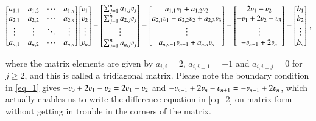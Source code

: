 \documentclass[11pt,english,a4paper]{article}
\begin{document}
\begin{flushleft}
\begin{align*}
\begin{bmatrix} a_{1,1} & a_{1,2} & \cdots & a_{1,n} \\ a_{2,1} & a_{2,2} & \cdots & a_{2,n}  \\ \vdots & \vdots & \ddots & \vdots \\ a_{n,1} & a_{n,2} & \cdots & a_{n,n} \end{bmatrix} \begin{bmatrix} \varv_1 \\ \varv_2 \\ \vdots \\  \varv_n \end{bmatrix} 
= \begin{bmatrix} \sum_{j=1}^n a_{1,j} \varv_j \\ \sum_{j=1}^n a_{2,j} \varv_j \\ \vdots \\ \sum_{j=1}^n a_{n,j} \varv_j \end{bmatrix} 
= \begin{bmatrix} a_{1,1} \varv_1 + a_{1,2} \varv_2 \\ a_{2,1} \varv_1 + a_{2,2} \varv_2 + a_{2,3} \varv_3 \\ \vdots \\ a_{n,n-1} \varv_{n-1} + a_{n,n} \varv_n \end{bmatrix} = \begin{bmatrix} 2 \varv_1 - \varv_2 \\ -\varv_1 + 2 \varv_2 - \varv_3 \\ \vdots \\ -\varv_{n-1} + 2 \varv_n \end{bmatrix} = \begin{bmatrix} b_1 \\ b_2 \\ \vdots \\ b_n \end{bmatrix} \,,  
\end{align*}

where the matrix elements are given by $a_{i,i} = 2$, $a_{i,i\pm 1} = -1$ and $a_{i,i\pm j} = 0$ for $j \geq 2$, and this is called a tridiagonal matrix. Please note the boundary condition in \eqref{eq_1} gives $-\varv_0 + 2 \varv_1 - \varv_2 = 2 \varv_1 - \varv_2$ and $-\varv_{n-1}+ 2\varv_n - \varv_{n+1} = -\varv_{n-1} + 2 \varv_n$, which actually enables us to write the difference equation in \eqref{eq_2} on matrix form without getting in trouble in the corners of the matrix. 


\end{flushleft}
\end{document}
